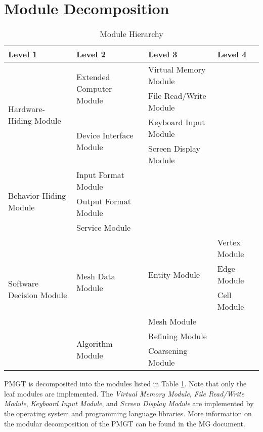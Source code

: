 \documentclass[12pt,titlepage]{article}
\begin{document}
\section{Module Decomposition \label{AmisSecMD}}
\begin{table}[ht]
\centering
\begin{tabular}{p{}|p{}|p{}|p{}}
\hline
\textbf{Level 1} & \textbf{Level 2} & \textbf{Level 3} & \textbf{Level 4} \\ \hline

\multirow{4}{0.15\textwidth}{Hardware-Hiding Module} 
& \multirow{2}{0.25\textwidth}{Extended Computer Module} & Virtual Memory Module&  \\ \cline{3-3}
&  & File Read/Write Module & \\ \cline{2-3}
& \multirow{2}{0.25\textwidth}{Device Interface Module} & Keyboard Input Module & \\\cline{3-3}
& & Screen Display Module & \\\hline

\multirow{3}{0.15\textwidth}{Behavior-Hiding Module} & Input Format Module & &\\ \cline{2-2}
& Output Format Module & &\\ \cline{2-2}
& Service Module & &\\\hline

\multirow{5}{0.15\textwidth}{Software Decision Module}
& \multirow{4}{0.25\textwidth}{Mesh Data Module} &
\multirow{3}{0.25\textwidth}{Entity Module} & Vertex Module \\ \cline{4-4}
& & & Edge Module \\ \cline{4-4}
& & & Cell Module \\ \cline{3-4}
& & Mesh Module & \\ \cline{2-4}
& \multirow {2}{0.25\textwidth}{Algorithm Module} & Refining Module & \\ \cline{3-3}
& & Coarsening Module & \\ \hline   

\end{tabular}
\caption{Module Hierarchy}
\label{AmisMH}
\end{table}

PMGT is decomposited into the modules listed in Table \ref{AmisMH}. Note that only the leaf modules are implemented. The \emph{Virtual Memory Module}, \emph{File Read/Write Module}, \emph{Keyboard Input Module}, and \emph{Screen Display Module} are implemented by the operating system and programming language libraries. More information on the modular decomposition of the PMGT can be found in the MG document.
\end{document}
